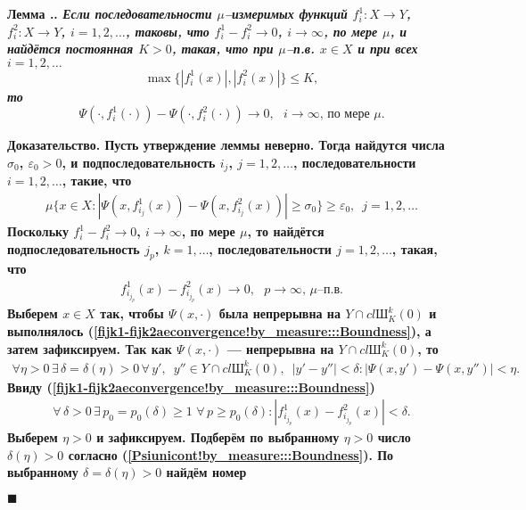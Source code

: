 \documentclass{report}
\newcounter{lem}[section]
\renewcommand{\thelem}{\thesection.\arabic{lem}}
\newenvironment{Lemma}{\par\refstepcounter{lem}\bf Лемма \thelem. \it}{\rm\par}
\newenvironment{Proof}{\par\noindent\bf Доказательство.\rm}{ $\blacksquare$\par}
\begin{document}
\begin{Lemma}\label{fi1fi2covergence->Psi(g,fi1)-Psi(g,fi2)convergence!by_measure:::Boundness}
Если последовательности $\mu$--измеримых функций $f_i^1\colon X\to Y$, $f_i^2\colon X\to Y$, $i=1,2,\dots$, таковы, что $f_i^1-f^2_i\to0$, $i\to\infty$, по мере $\mu$, и найдётся
постоянная $K>0$, такая, что при $\mu$--п.в. $x\in X$ и при всех $i=1,2,\dots$
$$
\max\{|f_i^1(x)|,|f_i^2(x)|\}\leqslant K,
$$
то
$$
\Psi(\cdot,f_i^1(\cdot))-\Psi(\cdot,f_i^2(\cdot))\to0,\text{ $i\to\infty$, по мере $\mu$.}
$$
\end{Lemma}
\begin{Proof}
Пусть утверждение леммы неверно.  Тогда найдутся числа $\sigma_0$, $\varepsilon_0>0$, и подпоследовательность $i_j$, $j=1,2,\dots$, последовательности $i=1,2,\dots$, такие, что
\begin{gather}\label{notPsi(g,fi1)-Psi(g,fi2)convergence!by_measure:::Boundness}
\mu\{x\in X:|\Psi(x,f^1_{i_j}(x))-\Psi(x,f^2_{i_j}(x))|\geqslant\sigma_0\}\geqslant\varepsilon_0,\,\,\,j=1,2,\dots
\end{gather}
Поскольку $f_i^1-f_i^2\to0$, $i\to\infty$, по мере $\mu$, то найдётся подпоследовательность $j_p$, $k=1,\dots$, последовательности $j=1,2,\dots$, такая, что
\begin{gather}\label{fijk1-fijk2aeconvergence!by_measure:::Boundness}
f_{i_{j_p}}^1(x)-f_{i_{j_p}}^2(x)\to0,\text{ $p\to\infty$, $\mu$--п.в}.
\end{gather}
Выберем $x\in X$ так, чтобы $\Psi(x,\cdot)$ была непрерывна на $Y\cap cl{{\textrm{Ш}}^{k}_K(0)}$ и выполнялось (\ref{fijk1-fijk2aeconvergence!by_measure:::Boundness}), а затем зафиксируем.
Так как $\Psi(x,\cdot)$ --- непрерывна на $Y\cap cl{{\textrm{Ш}}^{k}_K(0)}$, то
\begin{gather}\label{Psiunicont!by_measure:::Boundness}
\forall\eta>0\,\exists\,\delta=\delta(\eta)>0\,\forall\,y',\,\,\,y''\in Y\cap cl{{\textrm{Ш}}^{k}_K(0)},\,\,\,|y'-y''|<\delta: |\Psi(x,y')-\Psi(x,y'')|<\eta.
\end{gather}
Ввиду (\ref{fijk1-fijk2aeconvergence!by_measure:::Boundness})
\begin{gather}\label{fijk1(g)-fijk2(g)convergence!by_measure:::Boundness}
\forall\,\delta>0\,\exists\,p_0=p_0(\delta)\geqslant1\,\,\forall\,p\geqslant p_0(\delta):|f_{i_{j_p}}^1(x)-f_{i_{j_p}}^2(x)|<\delta.
\end{gather}
Выберем $\eta>0$ и зафиксируем. Подберём по выбранному $\eta>0$ число $\delta(\eta)>0$ согласно (\ref{Psiunicont!by_measure:::Boundness}). По выбранному $\delta=\delta(\eta)>0$ найдём номер

\end{Proof}
\end{document}
